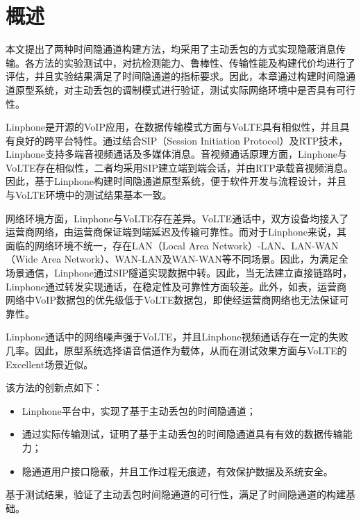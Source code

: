 \section{概述}
\label{chap:linphone:overview}

本文提出了两种时间隐通道构建方法，均采用了主动丢包的方式实现隐蔽消息传输。各方法的实验测试中，对抗检测能力、鲁棒性、传输性能及构建代价均进行了评估，并且实验结果满足了时间隐通道的指标要求。因此，本章通过构建时间隐通道原型系统，对主动丢包的调制模式进行验证，测试实际网络环境中是否具有可行性。

Linphone是开源的VoIP应用，在数据传输模式方面与VoLTE具有相似性，并且具有良好的跨平台特性。通过结合SIP（Session Initiation Protocol）及RTP技术，Linphone支持多端音视频通话及多媒体消息。音视频通话原理方面，Linphone与VoLTE存在相似性，二者均采用SIP建立端到端会话，并由RTP承载音视频消息。因此，基于Linphone构建时间隐通道原型系统，便于软件开发与流程设计，并且与VoLTE环境中的测试结果基本一致。

网络环境方面，Linphone与VoLTE存在差异。VoLTE通话中，双方设备均接入了运营商网络，由运营商保证端到端延迟及传输可靠性。而对于Linphone来说，其面临的网络环境不统一，存在LAN（Local Area Network）-LAN、LAN-WAN（Wide Area Network）、WAN-LAN及WAN-WAN等不同场景。因此，为满足全场景通信，Linphone通过SIP隧道实现数据中转。因此，当无法建立直接链路时，Linphone通过转发实现通话，在稳定性及可靠性方面较差。此外，如表，运营商网络中VoIP数据包的优先级低于VoLTE数据包，即使经运营商网络也无法保证可靠性。

Linphone通话中的网络噪声强于VoLTE，并且Linphone视频通话存在一定的失败几率。因此，原型系统选择语音信道作为载体，从而在测试效果方面与VoLTE的Excellent场景近似。

该方法的创新点如下：
\begin{itemize}
	\item Linphone平台中，实现了基于主动丢包的时间隐通道；
	\item 通过实际传输测试，证明了基于主动丢包的时间隐通道具有有效的数据传输能力；
	\item 隐通道用户接口隐蔽，并且工作过程无痕迹，有效保护数据及系统安全。
\end{itemize}

基于测试结果，验证了主动丢包时间隐通道的可行性，满足了时间隐通道的构建基础。